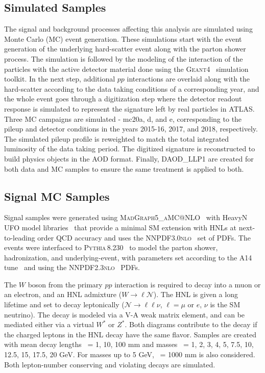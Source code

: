 \subsection{Simulated Samples}
The signal and background processes affecting this analysis are simulated using Monte Carlo (MC) event generation. These simulations start with the event generation of the underlying hard-scatter event along with the parton shower process. The simulation is followed by the modeling of the interaction of the particles with the active detector material done using the \textsc{Geant4}~\cite{AGOSTINELLI2003250} simulation toolkit. In the next step, additional $pp$ interactions are overlaid along with the hard-scatter according to the data taking conditions of a corresponding year, and the whole event goes through a digitization step where the detector readout response is simulated to represent the signature left by real particles in ATLAS. Three MC campaigns are simulated - mc20a, d, and e, corresponding to the pileup and detector conditions in the years 2015-16, 2017, and 2018, respectively. The simulated pileup profile is reweighted to match the total integrated luminosity of the data taking period. The digitized signature is reconstructed to build physics objects in the AOD format. Finally, DAOD\_LLP1 are created for both data and MC samples to ensure the same treatment is applied to both.

\subsection*{Signal MC Samples}
Signal samples were generated using \textsc{MadGraph5\_aMC@NLO}~\cite{Alwall:2014hca} with HeavyN UFO model libraries~\cite{PhysRevD.94.053002} that provide a minimal SM extension with HNLs at next-to-leading order QCD accuracy and uses the \textsc{NNPDF3.0nlo}~\cite{Ball:2014uwa} set of PDFs. The events were interfaced to \textsc{Pythia\,8.230}~\cite{Sjostrand:2014zea} to model the parton shower, hadronization, and underlying-event, with parameters set according to the A14 tune~\cite{ATL-PHYS-PUB-2014-021} and using the \textsc{NNPDF2.3nlo}~\cite{Ball:2012cx} PDFs.

The $W$ boson from the primary $pp$ interaction is required to decay into a muon or an electron, and an HNL admixture ($W\to\ell\mathcal{N}$). The HNL is given a long lifetime and set to decay leptonically ($\mathcal{N}\to\ell\ell\nu$, $\ell=\mu$ or $e$, $\nu$ is the SM neutrino). The decay is modeled via a V-A weak matrix element, and can be mediated either via a virtual $W^*$ or $Z^*$. Both diagrams contribute to the decay if the charged leptons in the HNL decay have the same flavor. Samples are created with mean decay lengths \ctau~= 1, 10, 100 mm and masses \mn~= 1, 2, 3, 4, 5, 7.5, 10, 12.5, 15, 17.5, 20 GeV. For masses up to 5 GeV, \ctau~= 1000 mm is also considered. Both lepton-number conserving and violating decays are simulated.

